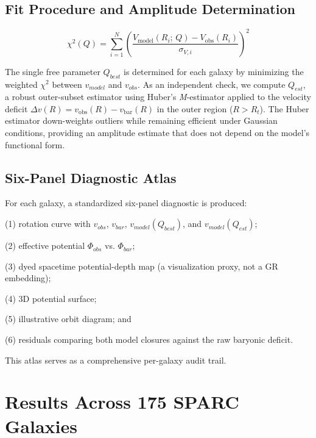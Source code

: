 \documentclass[11pt]{article}
\begin{document}
\subsection{Fit Procedure and Amplitude Determination}\label{fit-procedure-and-amplitude-determination}

\[\chi^{2}(Q) = \sum_{i = 1}^{N}\left( \frac{V_{\text{model}}\left( R_{i};\, Q \right) - V_{\text{obs}}\left( R_{i} \right)}{\sigma_{V,i}} \right)^{2}\]

The single free parameter \(Q_{best}\) is determined for each galaxy by minimizing the weighted \(\chi^{2}\) between \(v_{model}\) and \(v_{obs}\). As an independent check, we compute \(Q_{est}\), a robust outer-subset estimator using Huber's \emph{M}-estimator applied to the velocity deficit \(\Delta v(R) = v_{\text{obs}}(R) - v_{\text{bar}}(R)\) in the outer region (\(R > R_{t}\)). The Huber estimator down-weights outliers while remaining efficient under Gaussian conditions, providing an amplitude estimate that does not depend on the model's functional form.

\subsection{Six-Panel Diagnostic Atlas}\label{six-panel-diagnostic-atlas}

For each galaxy, a standardized six-panel diagnostic is produced:

(1) rotation curve with \(v_{obs}\), \(v_{bar}\), \(v_{model}\left( Q_{best} \right)\), and \(v_{model}\left( Q_{est} \right)\);

(2) effective potential \(\Phi_{obs}\) vs. \(\Phi_{bar}\);

(3) dyed spacetime potential-depth map (a visualization proxy, not a GR embedding);

(4) 3D potential surface;

(5) illustrative orbit diagram; and

(6) residuals comparing both model closures against the raw baryonic deficit.

This atlas serves as a comprehensive per-galaxy audit trail.


\section{Results Across 175 SPARC Galaxies}\label{results-across-175-sparc-galaxies}
\end{document}
